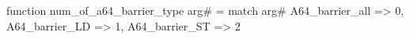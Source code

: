 function num_of_a64_barrier_type arg# = match arg# {
  A64_barrier_all => 0,
  A64_barrier_LD => 1,
  A64_barrier_ST => 2
}
